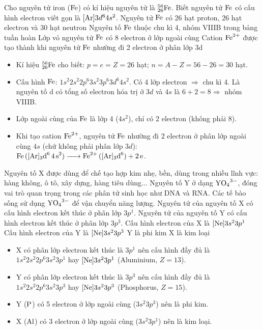 \documentclass[11pt,a4paper]{article}
\begin{document}
\begin{ex}%
Cho nguyên tử iron ($\ce{Fe}$) có kí hiệu nguyên tử là $^{56}_{26}\ce{Fe}$. Biết nguyên tử $\ce{Fe}$ có cấu hình electron viết gọn là $[\ce{Ar}]3d^6 4s^2$.
\choiceTF
{\True Nguyên tử $\ce{Fe}$ có 26 hạt proton, 26 hạt electron và 30 hạt neutron}
{\True Nguyên tố $\ce{Fe}$ thuộc chu kì 4, nhóm VIIIB trong bảng tuần hoàn}
{Lớp vỏ nguyên tử $\ce{Fe}$ có 8 electron ở lớp ngoài cùng}
{Cation $\ce{Fe^{2+}}$ được tạo thành khi nguyên tử $\ce{Fe}$ nhường đi 2 electron ở phân lớp 3d}
\begin{loigiai}
\begin{itemize}[leftmargin=1.5cm]
\item[\textbf{a) ĐÚNG:}] Kí hiệu $^{56}_{26}\ce{Fe}$ cho biết: $p = e = Z = 26$ hạt; $n = A - Z = 56 - 26 = 30$ hạt.
\item[\textbf{b) ĐÚNG:}] Cấu hình $\ce{Fe}$: $1s^2 2s^2 2p^6 3s^2 3p^6 3d^6 4s^2$. Có 4 lớp electron $\Rightarrow$ chu kì 4. Là nguyên tố d có tổng số electron hóa trị ở $3d$ và $4s$ là $6 + 2 = 8 \Rightarrow$ nhóm VIIIB.
\item[\textbf{c) SAI:}] Lớp ngoài cùng của $\ce{Fe}$ là lớp 4 ($4s^2$), chỉ có 2 electron (không phải 8).
\item[\textbf{d) SAI:}] Khi tạo cation $\ce{Fe^{2+}}$, nguyên tử $\ce{Fe}$ nhường đi 2 electron ở phân lớp ngoài cùng $4s$ (chứ không phải phân lớp $3d$): $\ce{Fe ([Ar]3d^6 4s^2) -> Fe^{2+} ([Ar]3d^6) + 2e}$.
\end{itemize}
\end{loigiai}
\end{ex}

\begin{ex}%
Nguyên tố X được dùng để chế tạo hợp kim nhẹ, bền, dùng trong nhiều lĩnh vực: hàng không, ô tô, xây dựng, hàng tiêu dùng... Nguyên tố Y ở dạng $\ce{YO4^{3-}}$, đóng vai trò quan trọng trong các phân tử sinh học như DNA và RNA. Các tế bào sống sử dụng $\ce{YO4^{3-}}$ để vận chuyển năng lượng. Nguyên tử của nguyên tố X có cấu hình electron kết thúc ở phân lớp $3p^1$. Nguyên tử của nguyên tố Y có cấu hình electron kết thúc ở phân lớp $3p^3$.
\choiceTF
{\True Cấu hình electron của X là $[\ce{Ne}]3s^2 3p^1$}
{\True Cấu hình electron của Y là $[\ce{Ne}]3s^2 3p^3$}
{\True Y là phi kim}
{\True X là kim loại}
\begin{loigiai}
\begin{itemize}[leftmargin=1.5cm]
\item[\textbf{a) ĐÚNG:}] X có phân lớp electron kết thúc là $3p^1$ nên cấu hình đầy đủ là $1s^2 2s^2 2p^6 3s^2 3p^1$ hay $[\ce{Ne}]3s^2 3p^1$ (Aluminium, $Z = 13$).
\item[\textbf{b) ĐÚNG:}] Y có phân lớp electron kết thúc là $3p^3$ nên cấu hình đầy đủ là $1s^2 2s^2 2p^6 3s^2 3p^3$ hay $[\ce{Ne}]3s^2 3p^3$ (Phosphorus, $Z = 15$).
\item[\textbf{c) ĐÚNG:}] Y ($\ce{P}$) có 5 electron ở lớp ngoài cùng ($3s^2 3p^3$) nên là phi kim.
\item[\textbf{d) ĐÚNG:}] X ($\ce{Al}$) có 3 electron ở lớp ngoài cùng ($3s^2 3p^1$) nên là kim loại.
\end{itemize}
\end{loigiai}
\end{ex}
\end{document}

